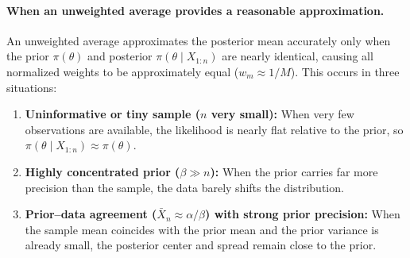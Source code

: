 \paragraph{When an unweighted average provides a reasonable approximation.}
An unweighted average approximates the posterior mean accurately only when the prior $\pi(\theta)$ and posterior $\pi(\theta \mid X_{1:n})$ are nearly identical, causing all normalized weights to be approximately equal ($w_m \approx 1/M$). This occurs in three situations:
\begin{enumerate}
    \item \textbf{Uninformative or tiny sample ($n$ very small):} When very few observations are available, the likelihood is nearly flat relative to the prior, so $\pi(\theta \mid X_{1:n}) \approx \pi(\theta)$.
    \item \textbf{Highly concentrated prior ($\beta \gg n$):} When the prior carries far more precision than the sample, the data barely shifts the distribution.
    \item \textbf{Prior--data agreement ($\bar{X}_n \approx \alpha/\beta$) with strong prior precision:} When the sample mean coincides with the prior mean and the prior variance is already small, the posterior center and spread remain close to the prior.
\end{enumerate}